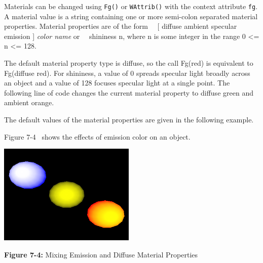 Materials can be changed using \texttt{Fg()} or \texttt{WAttrib()}
with the context attribute \texttt{fg}. A material value is a string
containing one or more
semi-colon separated material properties. Material properties are of
the form\newline
\ \ [ diffuse {\textbar} ambient {\textbar} specular {\textbar} emission
] \textit{color name} \newline
or \newline
\ \ {\textquotedbl}shininess n{\textquotedbl}, where n is some integer
in the range 0 {\textless}= n
{\textless}= 128.

The default material property type is diffuse, so the call
Fg({\textquotedbl}red{\textquotedbl}) is equivalent to
Fg({\textquotedbl}diffuse red{\textquotedbl}). For shininess, a value
of 0 spreads specular light broadly across an object and a value of 128
focuses specular light at a single point. The following line of code
changes the current material property to diffuse green and ambient
orange. 


\noindent The default values of the material properties are given in the
following example. 


\noindent Figure 7-4 \ shows the effects of emission color on an object. 

\bigskip

{\centering 
\includegraphics[width=2.5583in,height=1.8835in]{ub-img/ub-img34.png}
\par}

{\sffamily\bfseries Figure 7-4:}
{\sffamily Mixing Emission and Diffuse Material Properties}

\bigskip


